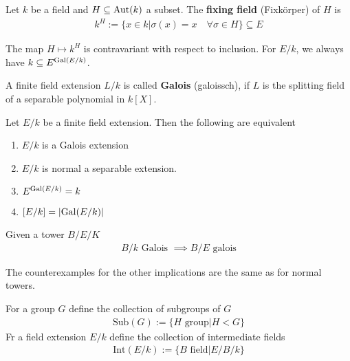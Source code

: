 \begin{dfn}[]
  Let $k$ be a field and $H \subseteq \operatorname{Aut}(k)$ a subset.
  The \textbf{fixing field} (Fixkörper) of $H$ is
  \begin{align*}
    k^{H} := \{x \in k \big\vert \sigma(x) = x \quad \forall  \sigma \in H\} \subseteq E
  \end{align*}
\end{dfn}
The map $H \mapsto k^{H}$ is contravariant with respect to inclusion.
For $E/k$, we always have $k \subseteq E^{\operatorname{Gal}(E/k)}$.

\begin{dfn}[]
  A finite field extension $L/k$ is called \textbf{Galois} (galoissch), if $L$ is the splitting field of a separable polynomial in $k[X]$.
\end{dfn}

\begin{prop}[]
  Let $E/k$ be a finite field extension. 
  Then the following are equivalent

  \begin{enumerate}
    \item $E/k$ is a Galois extension
    \item $E/k$ is normal a separable extension.
    \item $E^{\operatorname{Gal}(E/k)} = k$
    \item $[E/k] = \abs{\Gal(E/k)}$
  \end{enumerate}
\end{prop}


\begin{prop}[]
  Given a tower $B/E/K$
  \begin{align*}
    B/k \text{ Galois } \implies B/E \text{ galois}
  \end{align*}
\end{prop}
The counterexamples for the other implications are the same as for normal towers.


\begin{dfn}[]
For a group $G$ define the collection of subgroups of $G$
\begin{align*}
  \text{Sub}(G) := \{H \text{ group} \big\vert H < G\}
\end{align*}
Fr a field extension $E/k$ define the collection of intermediate fields
\begin{align*}
  \text{Int}(E/k) := \{B \text{ field} \big\vert E/B/k\}
\end{align*}
\end{dfn}


